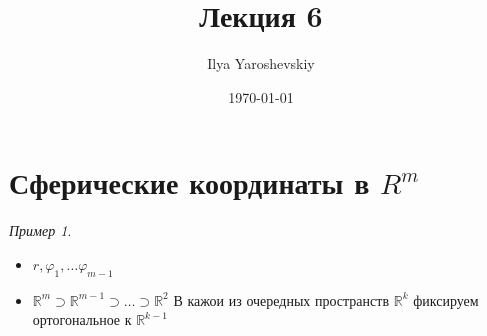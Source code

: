 \documentclass[english]{article}
\author{Ilya Yaroshevskiy}
\date{\today}
\title{Лекция 6}
\newcommand{\R}{\mathbb{R}}
\theoremstyle{plain}
\theoremstyle{remark}
\newtheorem*{examp}{Пример}
\theoremstyle{definition}
\begin{document}
\maketitle
\tableofcontents

\newcommand{\X}{\chi}
\newcommand{\A}{\mathfrak{A}}
\newcommand{\B}{\mathfrak{B}}
\newcommand{\M}{\mathfrak{M}}

\section{Сферические координаты в \(R^m\)}
\label{sec:orgace79bb}
\begin{examp}
\-
\begin{itemize}
\item \(r, \varphi_1, \dots \varphi_{m - 1}\)
\item \(\R^m \supset \R^{m - 1} \supset \dots \supset \R^2\)
В кажои из очередных пространств \(\R^k\) фиксируем ортогональное к \(\R^{k - 1}\)


\end{itemize}
\end{examp}
\end{document}

